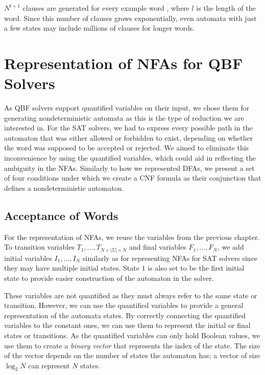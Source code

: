 $N^{l+1}$ clauses are generated for every example word , where $l$ is the length of the word. Since this number of clauses grows exponentially, even automata with just a few states may include millions of clauses for longer words.

\section{Representation of NFAs for QBF Solvers}

As QBF solvers support quantified variables on their input, we chose them for generating nondeterministic automata as this is the type of reduction we are interested in. For the SAT solvers, we had to express every possible path in the automaton that was either allowed or forbidden to exist, depending on whether the word was supposed to be accepted or rejected. We aimed to eliminate this inconvenience by using the quantified variables, which could aid in reflecting the ambiguity in the NFAs. Similarly to how we represented DFAs, we present a set of four conditions under which we create a CNF formula as their conjunction that defines a nondeterministic automaton.

\subsection{Acceptance of Words}

For the representation of NFAs, we reuse the variables from the previous chapter. To transition variables $T_1,\dots, T_{N\times |\Sigma| \times N}$ and final variables $F_1,\dots, F_N$, we add initial variables $I_1,\dots, I_N$ similarly as for representing NFAs for SAT solvers since they may have multiple initial states. State $1$ is also set to be the first initial state to provide easier construction of the automaton in the solver.

These variables are not quantified as they must always refer to the same state or transition. However, we can use the quantified variables to provide a general representation of the automata states. By correctly connecting the quantified variables to the constant ones, we can use them to represent the initial or final states or transitions. As the quantified variables can only hold Boolean values, we use them to create a \textit{binary vector} that represents the index of the state. The size of the vector depends on the number of states the automaton has; a vector of size $\log_{2}N$ can represent $N$ states.

